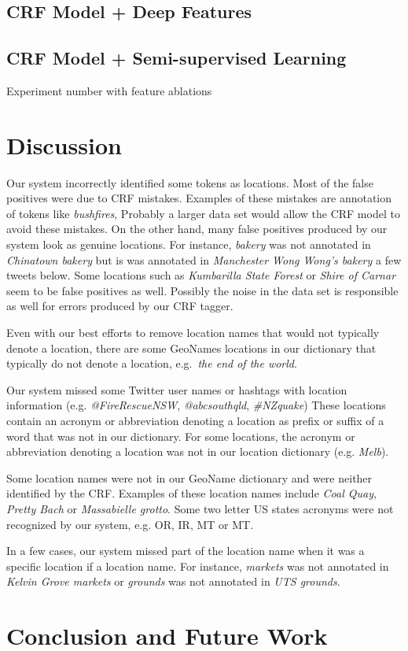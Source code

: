 \documentclass[11pt]{article}
\begin{document}
\subsection{CRF Model + Deep Features}
\subsection{CRF Model + Semi-supervised Learning}


Experiment number with feature ablations

\section{Discussion}
\label{sec:discussion}

Our system incorrectly identified some tokens as locations.
Most of the false positives were due to CRF mistakes.
Examples of these mistakes are annotation of tokens like \textit{bushfires}, 
Probably a larger data set would allow the CRF model to avoid these mistakes.
On the other hand, many false positives produced by our system look as genuine locations.
For instance, \textit{bakery} was not annotated in \textit{Chinatown bakery} but is was annotated in \textit{Manchester Wong Wong's bakery} a few tweets below.
Some locations such as \textit{Kumbarilla State Forest} or \textit{Shire of Carnar} seem to be false positives as well.
Possibly the noise in the data set is responsible as well for errors produced by our CRF tagger.

Even with our best efforts to remove location names that would not typically denote a location, there are some GeoNames locations in our dictionary that typically do not denote a location, e.g.~\textit{the end of the world}.

Our system missed some Twitter user names or hashtags with location information (e.g. \textit{@FireRescueNSW}, \textit{@abcsouthqld}, \textit{\#NZquake})
These locations contain an acronym or abbreviation denoting a location as prefix or suffix of a word that was not in our dictionary.
For some locations, the acronym or abbreviation denoting a location was not in our location dictionary (e.g. \textit{Melb}).

Some location names were not in our GeoName dictionary and were neither identified by the CRF.
Examples of these location names include \textit{Coal Quay}, \textit{Pretty Bach} or \textit{Massabielle grotto}.
Some two letter US states acronyms were not recognized by our system, e.g. OR, IR, MT or MT.

In a few cases, our system missed part of the location name when it was a specific location if a location name.
For instance, \textit{markets} was not annotated in \textit{Kelvin Grove markets} or \textit{grounds} was not annotated in \textit{UTS grounds}.


\section{Conclusion and Future Work}
\label{sec:conclusion}




\end{document}
